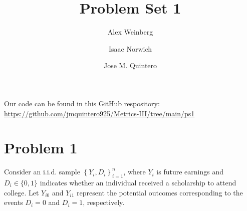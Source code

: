 \documentclass{article}
\title{Problem Set 1}
\author{Alex Weinberg \and Isaac Norwich \and Jose M. Quintero}
\begin{document}
\maketitle

Our code can be found in this GitHub respository: \url{https://github.com/jmquintero925/Metrics-III/tree/main/ps1}


\section*{Problem 1}
Consider an i.i.d. sample $\left\{Y_{i}, D_{i}\right\}_{i=1}^{n}$, where $Y_{i}$ is future earnings and $D_{i} \in\{0,1\}$ indicates whether an individual received a scholarship to attend college. Let $Y_{i 0}$ and $Y_{i 1}$ represent the potential outcomes corresponding to the events $D_{i}=0$ and $D_{i}=1$, respectively.
\end{document}
